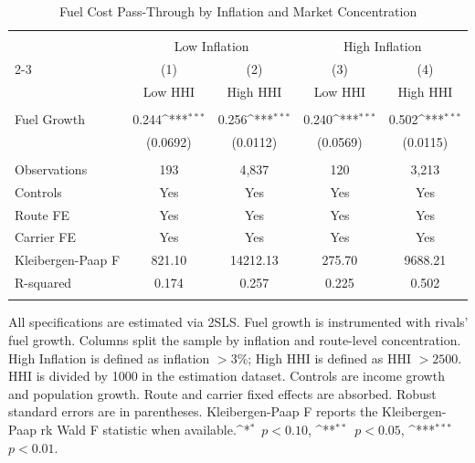 \begin{table}[p]
\centering
\caption{Fuel Cost Pass-Through by Inflation and Market Concentration}
\label{tab:inflation\_concentration}
\scriptsize
\setlength{\tabcolsep}{2pt}
\renewcommand{\arraystretch}{0.9}
\def\sym#1{\ifmmode^{#1}\else\(^{#1}\)\fi}
\begin{tabular}{l*{4}{c}}
\\[-1.8ex]\hline
\hline \\[-1.8ex]
                    &\multicolumn{2}{c}{Low Inflation}          &\multicolumn{2}{c}{High Inflation}         \\\cline{2-3}\cline{4-5}
                    &\multicolumn{1}{c}{(1)}&\multicolumn{1}{c}{(2)}&\multicolumn{1}{c}{(3)}&\multicolumn{1}{c}{(4)}\\
                    &\multicolumn{1}{c}{Low HHI}&\multicolumn{1}{c}{High HHI}&\multicolumn{1}{c}{Low HHI}&\multicolumn{1}{c}{High HHI}\\
\hline \\[-1.8ex]
Fuel Growth         &       0.244\sym{***}&       0.256\sym{***}&       0.240\sym{***}&       0.502\sym{***}\\
                    &    (0.0692)         &    (0.0112)         &    (0.0569)         &    (0.0115)         \\
\hline \\[-1.8ex]
Observations        &         193         &       4,837         &         120         &       3,213         \\
Controls            &         Yes         &         Yes         &         Yes         &         Yes         \\
Route FE            &         Yes         &         Yes         &         Yes         &         Yes         \\
Carrier FE          &         Yes         &         Yes         &         Yes         &         Yes         \\
Kleibergen-Paap F   &      821.10         &    14212.13         &      275.70         &     9688.21         \\
R-squared           &       0.174         &       0.257         &       0.225         &       0.502         \\
\hline \\[-1.8ex]
\end{tabular}
\begin{tablenotes}[Note]
All specifications are estimated via 2SLS. Fuel growth is instrumented with rivals' fuel growth. Columns split the sample by inflation and route-level concentration. High Inflation is defined as inflation $>3\%$; High HHI is defined as HHI $>2500$. HHI is divided by 1000 in the estimation dataset. Controls are income growth and population growth. Route and carrier fixed effects are absorbed. Robust standard errors are in parentheses. Kleibergen-Paap F reports the Kleibergen-Paap rk Wald F statistic when available.\sym{*}~$p<0.10$, \sym{**}~$p<0.05$, \sym{***}~$p<0.01$.
\end{tablenotes}
\end{table}
